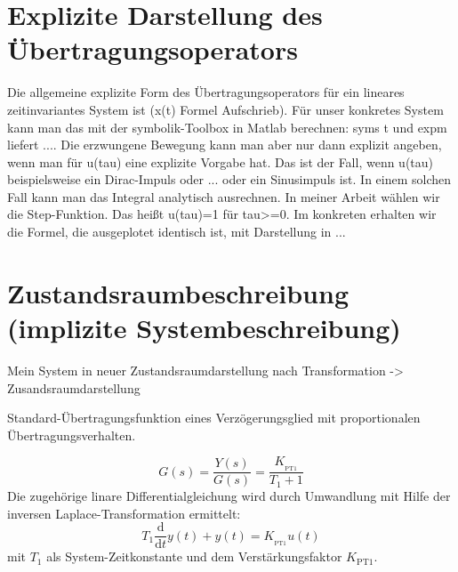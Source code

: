 \documentclass[
  ngerman
  ,12pt
  ,pdftex
]{article}
\begin{document}


\section{Explizite Darstellung des Übertragungsoperators} %
Die allgemeine explizite Form des Übertragungsoperators für ein lineares zeitinvariantes System ist (x(t) Formel Aufschrieb).
Für unser konkretes System kann man das mit der symbolik-Toolbox in Matlab berechnen: syms t und expm liefert ....
Die erzwungene Bewegung kann man aber nur dann explizit angeben, wenn man für u(tau) eine explizite Vorgabe hat. Das ist der Fall, wenn u(tau) beispielsweise ein Dirac-Impuls oder ... oder ein Sinusimpuls ist. In einem solchen Fall kann man das Integral analytisch ausrechnen. In meiner Arbeit wählen wir die Step-Funktion. Das heißt u(tau)=1 für tau>=0. Im konkreten erhalten wir die Formel, die ausgeplotet identisch ist, mit Darstellung in ...

\section{Zustandsraumbeschreibung (implizite Systembeschreibung)}
Mein System in neuer Zustandsraumdarstellung nach Transformation
-> Zusandsraumdarstellung



Standard-Übertragungsfunktion eines 
Verzögerungsglied mit proportionalen Übertragungsverhalten.

\begin{equation*}
  G(s) = \frac{Y(s)}{G(s)} = \frac{K__\text{PT1}}{T_1+1}
\end{equation*}
Die zugehörige linare Differentialgleichung wird durch Umwandlung mit Hilfe der inversen Laplace-Transformation ermittelt:
\begin{equation*}
  T_1\frac{\mathrm d}{\mathrm dt}y(t)+y(t)=K__\text{PT1}u(t)
\end{equation*}
mit $T_1$ als System-Zeitkonstante und dem Verstärkungsfaktor $K_\text{PT1}$.
\end{document}
